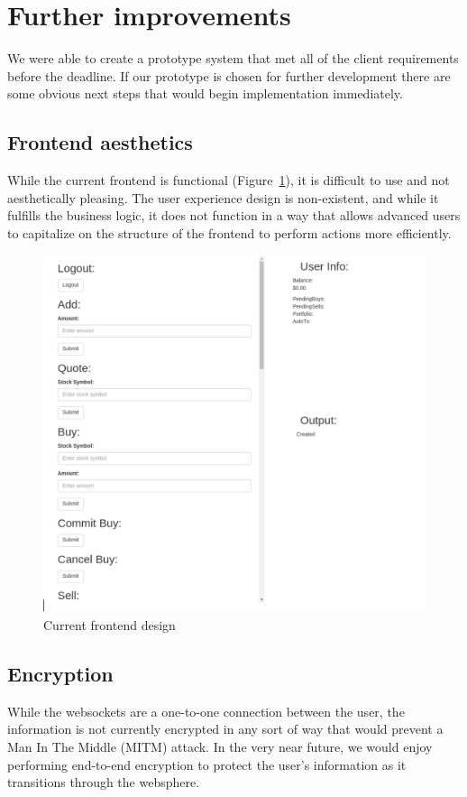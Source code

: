 \section{Further improvements}
We were able to create a prototype system that met all of the client requirements before the deadline.
If our prototype is chosen for further development there are some obvious next steps that would begin implementation immediately.

\subsection{Frontend aesthetics}
While the current frontend is functional (Figure~\ref{fig:fe}), it is difficult to use and not aesthetically pleasing.
The user experience design is non-existent, and while it fulfills the business logic, it does not function in a way that allows advanced users to capitalize on the structure of the frontend to perform actions more efficiently.

\begin{figure}[tbph]
  \centering
  \includegraphics[width=0.7\linewidth]{graphics/fe}
  \caption{Current frontend design}
  \label{fig:fe}
\end{figure}

\subsection{Encryption}
While the websockets are a one-to-one connection between the user, the information is not currently encrypted in any sort of way that would prevent a Man In The Middle (MITM) attack.
In the very near future, we would enjoy performing end-to-end encryption to protect the user's information as it transitions through the websphere.

